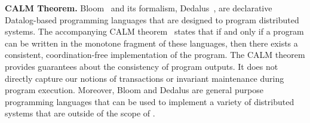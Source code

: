 
\textbf{CALM Theorem.}
Bloom~\cite{alvaro2010boom, alvaro2011consistency, conway2012logic} and its
formalism, Dedalus~\cite{alvaro2011dedalus, alvaro2013declarative}, are
declarative Datalog-based programming languages that are designed to program
distributed systems. The accompanying CALM
theorem~\cite{hellerstein2010declarative, ameloot2013relational} states that if and only if
a program can be written in the monotone fragment of these languages, then
there exists a consistent, coordination-free implementation of the program.  The CALM
theorem provides guarantees about the consistency of program outputs. It does not directly capture our notions of transactions or invariant maintenance during program execution.
Moreover, Bloom and Dedalus are general purpose programming
languages that can be used to implement a variety of distributed systems that
are outside of the scope of \invariantconfluence{}.

